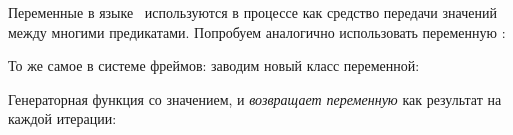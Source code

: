 
Переменные в языке \prolog\ используются в процессе 
как средство передачи значений между многими предикатами. Попробуем аналогично
использовать переменную \py:

\medskip
{}

То же самое в системе фреймов: заводим новый класс переменной:


Генераторная функция  со значением, и
\emph{возвращает переменную} как результат на каждой итерации:

